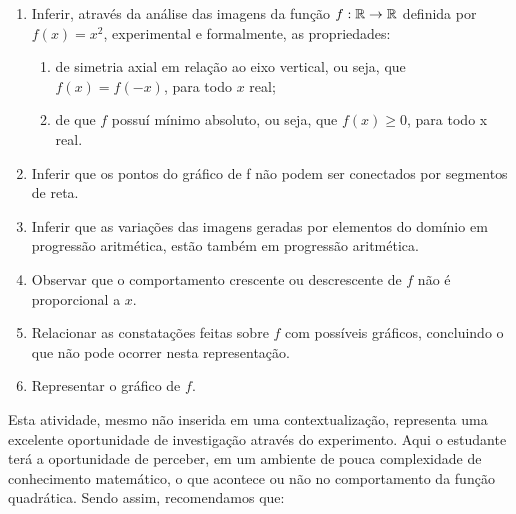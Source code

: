 \documentclass[10 pt,usenames,dvipsnames, oneside]{article}
\begin{document}
\begin{goals}
\begin{enumerate}
\item Inferir, através da análise das imagens da função $f:\mathbb{R}\to\mathbb{R}$ definida por $f(x)=x^2$, experimental e formalmente, as propriedades:

\begin{enumerate}[leftmargin=2.5pt]
\item de simetria axial em relação ao eixo vertical, ou seja, que $f(x)=f(−x)$, para todo $x$ real;

\item de que $f$ possuí mínimo absoluto, ou seja, que $f(x)\geq0$, para todo x real.
\end{enumerate}

\item Inferir que os pontos do gráfico de f não podem ser conectados por segmentos de reta.

\item Inferir que as variações das imagens geradas por elementos do domínio em progressão aritmética, estão também em progressão aritmética.

\item Observar que o comportamento crescente ou descrescente de $f$ não é proporcional a $x$.

\item Relacionar as constatações feitas sobre $f$ com possíveis gráficos, concluindo o que não pode ocorrer nesta representação.

\item Representar o gráfico de $f$.
\end{enumerate}

\tcblower

Esta atividade, mesmo não inserida em uma contextualização, representa uma excelente oportunidade de investigação através do experimento. Aqui o estudante terá a oportunidade de perceber, em um ambiente de pouca complexidade de conhecimento matemático, o que acontece ou não no comportamento da função quadrática. Sendo assim, recomendamos que:


\end{goals}
\end{document}
